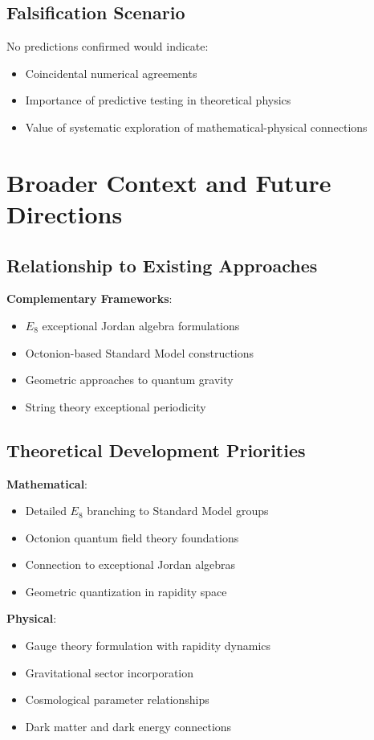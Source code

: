 \documentclass[12pt,a4paper]{article}
\begin{document}
\subsection{Falsification Scenario}

No predictions confirmed would indicate:
\begin{itemize}
\item Coincidental numerical agreements
\item Importance of predictive testing in theoretical physics
\item Value of systematic exploration of mathematical-physical connections
\end{itemize}

\section{Broader Context and Future Directions}

\subsection{Relationship to Existing Approaches}

\textbf{Complementary Frameworks}:
\begin{itemize}
\item $E_{8}$ exceptional Jordan algebra formulations
\item Octonion-based Standard Model constructions
\item Geometric approaches to quantum gravity
\item String theory exceptional periodicity
\end{itemize}

\subsection{Theoretical Development Priorities}

\textbf{Mathematical}:
\begin{itemize}
\item Detailed $E_{8}$ branching to Standard Model groups
\item Octonion quantum field theory foundations
\item Connection to exceptional Jordan algebras
\item Geometric quantization in rapidity space
\end{itemize}

\textbf{Physical}:
\begin{itemize}
\item Gauge theory formulation with rapidity dynamics
\item Gravitational sector incorporation
\item Cosmological parameter relationships
\item Dark matter and dark energy connections
\end{itemize}
\end{document}
